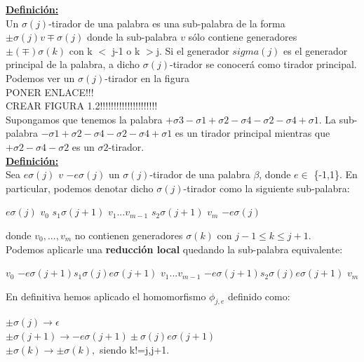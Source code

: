 \documentclass[14pt]{extarticle}
\begin{document}
\underline{\textbf{Definición:}}\\
 Un $ \sigma(j) $-tirador de una palabra es una sub-palabra de la forma $ \pm \sigma(j) v \mp \sigma(j) $ donde la sub-palabra $v$ sólo contiene generadores $ \pm (\mp) \sigma(k) $ con k $<$ j-1 o k $>$j. Si el generador $sigma(j)$ es el generador principal de la palabra, a dicho $ \sigma(j) $-tirador se conocerá como tirador principal.\\
 
 Podemos ver un $ \sigma(j) $-tirador en la figura \\PONER ENLACE!!!\\
 CREAR FIGURA 1.2!!!!!!!!!!!!!!!!!!!!!\\
 
 Supongamos que tenemos la palabra $ +\sigma3-\sigma1+\sigma2-\sigma4-\sigma2-\sigma4+\sigma1 $. La sub-palabra $ -\sigma1+\sigma2-\sigma4-\sigma2-\sigma4+\sigma1  $ es un tirador principal mientras que $ +\sigma2-\sigma4-\sigma2 $ es un $ \sigma2 $-tirador.\\
 
\underline{\textbf{ Definición:}}\\
Sea $ e \sigma(j)$ $v$ $-e \sigma(j) $ un $\sigma(j)$-tirador de una palabra $\beta$, donde $e \in$ \{-1,1\}. En particular, podemos denotar dicho $\sigma(j)$-tirador como la siguiente sub-palabra:
\begin{center}
	$ e \sigma(j) $ $ v_{0} $ $s_{1} \sigma(j+1) $ $ v_{1}...v_{m-1} $ $s_{2} \sigma(j+1) $ $ v_{m} $ $ -e \sigma(j) $
\end{center} donde $v_{0},...,v_{m}$ no contienen generadores $\sigma(k)$ con $ j-1 \le k \le j+1 $.\\
Podemos aplicarle una \textbf{reducción local} quedando la sub-palabra equivalente:
\begin{center}
 $ v_{0} $ $-e \sigma(j+1) s_{1} \sigma(j) e \sigma(j+1)$ $ v_{1}...v_{m-1} $ $-e \sigma(j+1) s_{2} \sigma(j) e \sigma(j+1)$ $ v_{m} $
\end{center}
En definitiva hemos aplicado el homomorfismo $\phi_{j,e}$ definido como:\\
\begin{center}
	$\pm \sigma(j) \rightarrow \epsilon$\\
	$\pm \sigma(j+1) \rightarrow -e \sigma(j+1) \pm \sigma(j) e \sigma(j+1)$\\
	$\pm \sigma(k) \rightarrow \pm \sigma(k),$ siendo k!=j,j+1.\\
\end{center}
\end{document}
